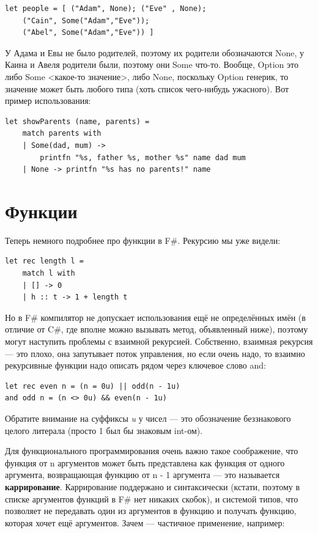 \documentclass[a5paper]{article}
\begin{document}
\begin{verbatim}
let people = [ ("Adam", None); ("Eve" , None);
    ("Cain", Some("Adam","Eve"));
    ("Abel", Some("Adam","Eve")) ]
\end{verbatim}

У Адама и Евы не было родителей, поэтому их родители обозначаются None, у Каина и Авеля родители были, поэтому они Some что-то. Вообще, Option это либо Some <какое-то значение>, либо None, поскольку Option генерик, то значение может быть любого типа (хоть список чего-нибудь ужасного). Вот пример использования:

\begin{verbatim}
let showParents (name, parents) =
    match parents with
    | Some(dad, mum) -> 
        printfn "%s, father %s, mother %s" name dad mum
    | None -> printfn "%s has no parents!" name
\end{verbatim}

\section{Функции}

Теперь немного подробнее про функции в F\#. Рекурсию мы уже видели:

\begin{verbatim}
let rec length l =
    match l with
    | [] -> 0
    | h :: t -> 1 + length t
\end{verbatim}

Но в F\# компилятор не допускает использования ещё не определённых имён (в отличие от C\#, где вполне можно вызывать метод, объявленный ниже), поэтому могут наступить проблемы с взаимной рекурсией. Собственно, взаимная рекурсия --- это плохо, она запутывает поток управления, но если очень надо, то взаимно рекурсивные функции надо описать рядом через ключевое слово and:

\begin{verbatim}
let rec even n = (n = 0u) || odd(n - 1u)
and odd n = (n <> 0u) && even(n - 1u)
\end{verbatim}

Обратите внимание на суффиксы \textit{u} у чисел --- это обозначение беззнакового целого литерала (просто 1 был бы знаковым int-ом).

Для функционального программирования очень важно такое соображение, что функция от n аргументов может быть представлена как функция от одного аргумента, возвращающая функцию от n - 1 аргумента --- это называется \textbf{каррирование}. Каррирование поддержано и синтаксически (кстати, поэтому в списке аргументов функций в F\# нет никаких скобок), и системой типов, что позволяет не передавать один из аргументов в функцию и получать функцию, которая хочет ещё аргументов. Зачем --- частичное применение, например:
\end{document}
